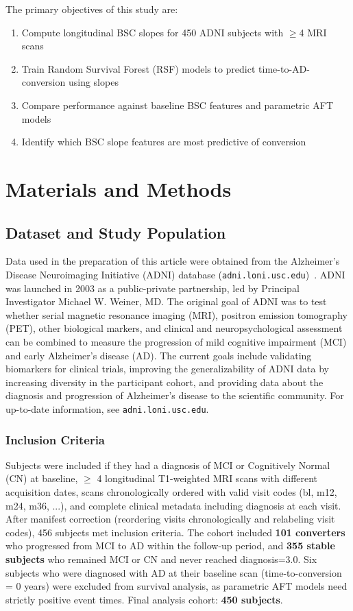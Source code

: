 \documentclass[blue]{ludusofficial}  %
\begin{document}
The primary objectives of this study are:

\begin{enumerate}
    \item Compute longitudinal BSC slopes for 450 ADNI subjects with $\geq$4 MRI scans
    \item Train Random Survival Forest (RSF) models to predict time-to-AD-conversion using slopes
    \item Compare performance against baseline BSC features and parametric AFT models
    \item Identify which BSC slope features are most predictive of conversion
\end{enumerate}

\section{Materials and Methods}

\subsection{Dataset and Study Population}

Data used in the preparation of this article were obtained from the Alzheimer's Disease Neuroimaging Initiative (ADNI) database (\texttt{adni.loni.usc.edu})~\cite{weiner2010adni,petersen2010adni}. ADNI was launched in 2003 as a public-private partnership, led by Principal Investigator Michael W. Weiner, MD. The original goal of ADNI was to test whether serial magnetic resonance imaging (MRI), positron emission tomography (PET), other biological markers, and clinical and neuropsychological assessment can be combined to measure the progression of mild cognitive impairment (MCI) and early Alzheimer's disease (AD). The current goals include validating biomarkers for clinical trials, improving the generalizability of ADNI data by increasing diversity in the participant cohort, and providing data about the diagnosis and progression of Alzheimer's disease to the scientific community. For up-to-date information, see \texttt{adni.loni.usc.edu}.

\subsubsection{Inclusion Criteria}

Subjects were included if they had a diagnosis of MCI or Cognitively Normal (CN) at baseline, $\geq$ 4 longitudinal T1-weighted MRI scans with different acquisition dates, scans chronologically ordered with valid visit codes (bl, m12, m24, m36, ...), and complete clinical metadata including diagnosis at each visit. After manifest correction (reordering visits chronologically and relabeling visit codes), 456 subjects met inclusion criteria. The cohort included \textbf{101 converters} who progressed from MCI to AD within the follow-up period, and \textbf{355 stable subjects} who remained MCI or CN and never reached diagnosis=3.0. Six subjects who were diagnosed with AD at their baseline scan (time-to-conversion = 0 years) were excluded from survival analysis, as parametric AFT models need strictly positive event times. Final analysis cohort: \textbf{450 subjects}.
\end{document}
